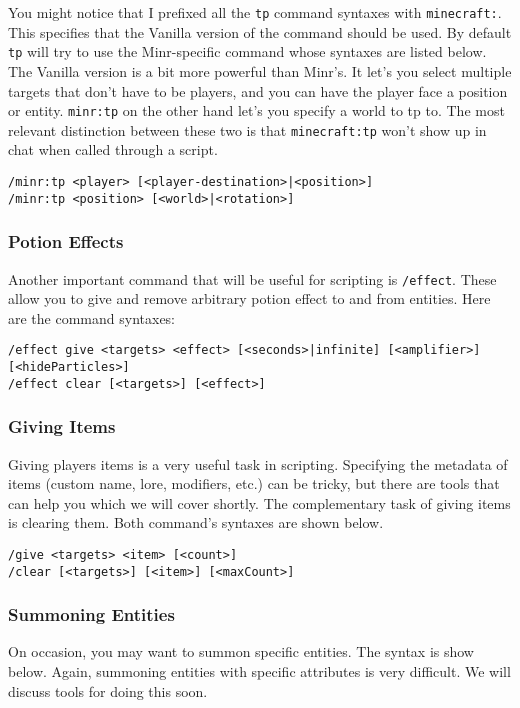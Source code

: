 \documentclass[oneside]{book}
\begin{document}
You might notice that I prefixed all the \texttt{tp} command syntaxes with \texttt{minecraft:}. This specifies that the Vanilla version of the command should be used. By default \texttt{tp} will try to use the Minr-specific command whose syntaxes are listed below. The Vanilla version is a bit more powerful than Minr's. It let's you select multiple targets that don't have to be players, and you can have the player face a position or entity. \texttt{minr:tp} on the other hand let's you specify a world to tp to. The most relevant distinction between these two is that \texttt{minecraft:tp} won't show up in chat when called through a script.

\begin{verbatim}
/minr:tp <player> [<player-destination>|<position>]
/minr:tp <position> [<world>|<rotation>]
\end{verbatim}

\subsubsection*{Potion Effects}
Another important command that will be useful for scripting is \texttt{/effect}. These allow you to give and remove arbitrary potion effect to and from entities. Here are the command syntaxes:

\begin{verbatim}
/effect give <targets> <effect> [<seconds>|infinite] [<amplifier>]
[<hideParticles>]
/effect clear [<targets>] [<effect>]
\end{verbatim}

\subsubsection*{Giving Items}
Giving players items is a very useful task in scripting. Specifying the metadata of items (custom name, lore, modifiers, etc.) can be tricky, but there are tools that can help you which we will cover shortly. The complementary task of giving items is clearing them. Both command's syntaxes are shown below.

\begin{verbatim}
/give <targets> <item> [<count>]
/clear [<targets>] [<item>] [<maxCount>]
\end{verbatim}

\subsubsection*{Summoning Entities}
On occasion, you may want to summon specific entities. The syntax is show below. Again, summoning entities with specific attributes is very difficult. We will discuss tools for doing this soon.
\end{document}
